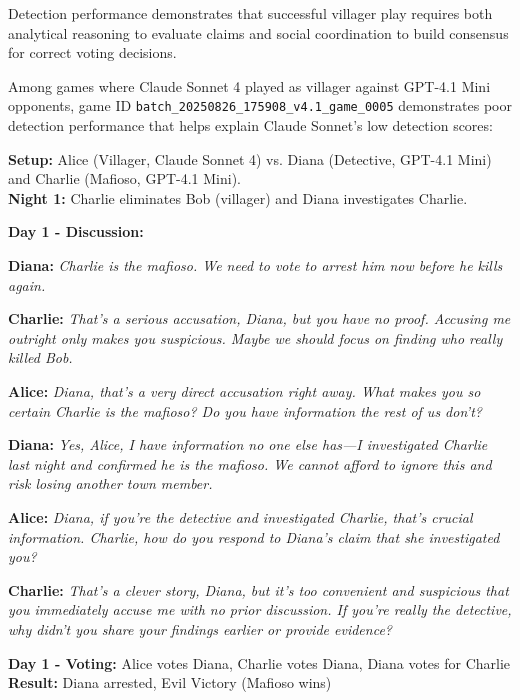 \documentclass{article}
\begin{document}
Detection performance demonstrates that successful villager play requires both analytical reasoning to evaluate claims and social coordination to build consensus for correct voting decisions.



Among games where Claude Sonnet 4 played as villager against GPT-4.1 Mini opponents, game ID \texttt{batch\_20250826\_175908\_v4.1\_game\_0005} demonstrates poor detection performance that helps explain Claude Sonnet's low detection scores:

\begin{setupbox}
\textbf{Setup:} Alice (Villager, Claude Sonnet 4) vs. Diana (Detective, GPT-4.1 Mini) and Charlie (Mafioso, GPT-4.1 Mini).\\
\textbf{Night 1:} Charlie eliminates Bob (villager) and Diana investigates Charlie.
\end{setupbox}

\begin{dialoguebox}
\textbf{Day 1 - Discussion:}

\medskip
\textbf{Diana:} \textit{Charlie is the mafioso. We need to vote to arrest him now before he kills again.}

\medskip
\textbf{Charlie:} \textit{That's a serious accusation, Diana, but you have no proof. Accusing me outright only makes you suspicious. Maybe we should focus on finding who really killed Bob.}

\medskip
\textbf{Alice:} \textit{Diana, that's a very direct accusation right away. What makes you so certain Charlie is the mafioso? Do you have information the rest of us don't?}

\medskip
\textbf{Diana:} \textit{Yes, Alice, I have information no one else has—I investigated Charlie last night and confirmed he is the mafioso. We cannot afford to ignore this and risk losing another town member.}

\medskip
\textbf{Alice:} \textit{Diana, if you're the detective and investigated Charlie, that's crucial information. Charlie, how do you respond to Diana's claim that she investigated you?}

\medskip
\textbf{Charlie:} \textit{That's a clever story, Diana, but it's too convenient and suspicious that you immediately accuse me with no prior discussion. If you're really the detective, why didn't you share your findings earlier or provide evidence?}
\end{dialoguebox}

\begin{resultbox}
\textbf{Day 1 - Voting:} Alice votes Diana, Charlie votes Diana, Diana votes for Charlie\\
\textbf{Result:} Diana arrested, Evil Victory (Mafioso wins)
\end{resultbox}
\end{document}
